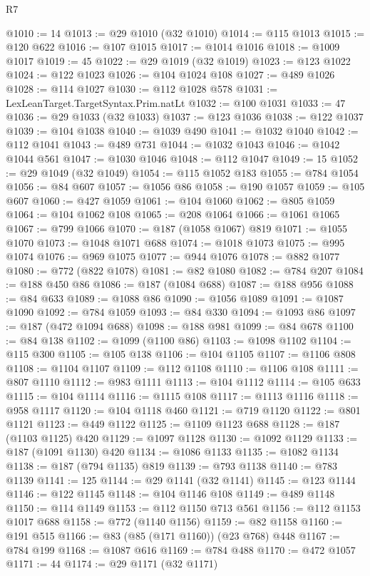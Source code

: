 \begin{lexlean}{R7}
\begin{coremodule}
@1010 := 14
@1013 := @29 @1010 (@32 @1010)
@1014 := @115 @1013
@1015 := @120 @622
@1016 := @107 @1015
@1017 := @1014 @1016
@1018 := @1009 @1017
@1019 := 45
@1022 := @29 @1019 (@32 @1019)
@1023 := @123 @1022
@1024 := @122 @1023
@1026 := @104 @1024 @108
@1027 := @489 @1026
@1028 := @114 @1027
@1030 := @112 @1028 @578
@1031 := LexLeanTarget.TargetSyntax.Prim.natLt
@1032 := @100 @1031
@1033 := 47
@1036 := @29 @1033 (@32 @1033)
@1037 := @123 @1036
@1038 := @122 @1037
@1039 := @104 @1038
@1040 := @1039 @490
@1041 := @1032 @1040
@1042 := @112 @1041
@1043 := @489 @731
@1044 := @1032 @1043
@1046 := @1042 @1044 @561
@1047 := @1030 @1046
@1048 := @112 @1047
@1049 := 15
@1052 := @29 @1049 (@32 @1049)
@1054 := @115 @1052 @183
@1055 := @784 @1054
@1056 := @84 @607
@1057 := @1056 @86
@1058 := @190 @1057
@1059 := @105 @607
@1060 := @427 @1059
@1061 := @104 @1060
@1062 := @805 @1059
@1064 := @104 @1062 @108
@1065 := @208 @1064
@1066 := @1061 @1065
@1067 := @799 @1066
@1070 := @187 (@1058 @1067) @819
@1071 := @1055 @1070
@1073 := @1048 @1071 @688
@1074 := @1018 @1073
@1075 := @995 @1074
@1076 := @969 @1075
@1077 := @944 @1076
@1078 := @882 @1077
@1080 := @772 (@822 @1078)
@1081 := @82 @1080
@1082 := @784 @207
@1084 := @188 @450 @86
@1086 := @187 (@1084 @688)
@1087 := @188 @956
@1088 := @84 @633
@1089 := @1088 @86
@1090 := @1056 @1089
@1091 := @1087 @1090
@1092 := @784 @1059
@1093 := @84 @330
@1094 := @1093 @86
@1097 := @187 (@472 @1094 @688)
@1098 := @188 @981
@1099 := @84 @678
@1100 := @84 @138
@1102 := @1099 (@1100 @86)
@1103 := @1098 @1102
@1104 := @115 @300
@1105 := @105 @138
@1106 := @104 @1105
@1107 := @1106 @808
@1108 := @1104 @1107
@1109 := @112 @1108
@1110 := @1106 @108
@1111 := @807 @1110
@1112 := @983 @1111
@1113 := @104 @1112
@1114 := @105 @633
@1115 := @104 @1114
@1116 := @1115 @108
@1117 := @1113 @1116
@1118 := @958 @1117
@1120 := @104 @1118 @460
@1121 := @719 @1120
@1122 := @801 @1121
@1123 := @449 @1122
@1125 := @1109 @1123 @688
@1128 := @187 (@1103 @1125) @420
@1129 := @1097 @1128
@1130 := @1092 @1129
@1133 := @187 (@1091 @1130) @420
@1134 := @1086 @1133
@1135 := @1082 @1134
@1138 := @187 (@794 @1135) @819
@1139 := @793 @1138
@1140 := @783 @1139
@1141 := 125
@1144 := @29 @1141 (@32 @1141)
@1145 := @123 @1144
@1146 := @122 @1145
@1148 := @104 @1146 @108
@1149 := @489 @1148
@1150 := @114 @1149
@1153 := @112 @1150 @713 @561
@1156 := @112 @1153 @1017 @688
@1158 := @772 (@1140 @1156)
@1159 := @82 @1158
@1160 := @191 @515
@1166 := @83 (@85 (@171 @1160)) (@23 @768) @448
@1167 := @784 @199
@1168 := @1087 @616
@1169 := @784 @488
@1170 := @472 @1057
@1171 := 44
@1174 := @29 @1171 (@32 @1171)

\end{coremodule}
\end{lexlean}
